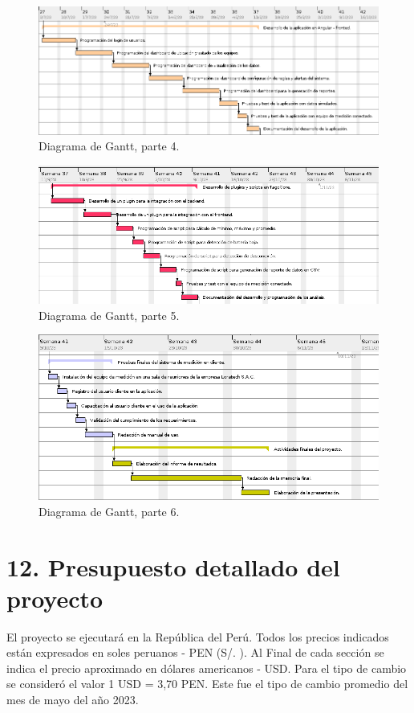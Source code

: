 \documentclass[
11pt, %
]{charter}
\begin{document}
\begin{figure}[htpb]
\centering 
\includegraphics[height=.25\textheight]{./Figuras/Gantt4.png}
\caption{Diagrama de Gantt, parte 4.}
\label{fig:diagGantt4}
\end{figure}

\begin{figure}[htpb]
\centering 
\includegraphics[height=.26\textheight]{./Figuras/Gantt5.png}
\caption{Diagrama de Gantt, parte 5.}
\label{fig:diagGantt5}
\end{figure}

\begin{figure}[htpb]
\centering 
\includegraphics[height=.31\textheight]{./Figuras/Gantt6.png}
\caption{Diagrama de Gantt, parte 6.}
\label{fig:diagGantt6}
\end{figure}

\section{12. Presupuesto detallado del proyecto}
\label{sec:presupuesto}
El proyecto se ejecutará en la República del Perú. Todos los precios indicados están expresados en soles peruanos - PEN (S/. ). Al Final de cada sección se indica el precio aproximado en dólares americanos - USD. Para el tipo de cambio se consideró el valor 1 USD = 3,70 PEN. Este fue el tipo de cambio promedio del mes de mayo del año 2023.
\end{document}
